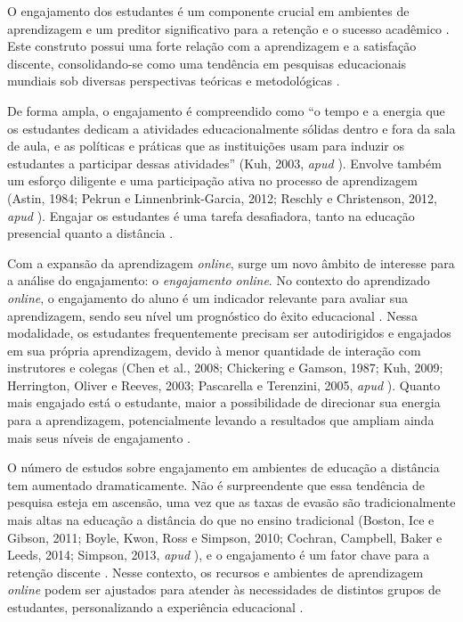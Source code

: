 O engajamento dos estudantes é um componente crucial em ambientes de aprendizagem e um preditor significativo para a retenção e o sucesso acadêmico \cite{yilmazEngagementDistanceEducation2020}. Este construto possui uma forte relação com a aprendizagem e a satisfação discente, consolidando-se como uma tendência em pesquisas educacionais mundiais sob diversas perspectivas teóricas e metodológicas \cite{ortegaMensuracaoEngajamentoOnline2022}.

De forma ampla, o engajamento é compreendido como ``o tempo e a energia que os estudantes dedicam a atividades educacionalmente sólidas dentro e fora da sala de aula, e as políticas e práticas que as instituições usam para induzir os estudantes a participar dessas atividades'' (Kuh, 2003, \textit{apud} \cite{yilmazEngagementDistanceEducation2020}). Envolve também um esforço diligente e uma participação ativa no processo de aprendizagem (Astin, 1984; Pekrun e Linnenbrink-Garcia, 2012; Reschly e Christenson, 2012, \textit{apud} \cite{henrieMeasuringStudentEngagement2015}). Engajar os estudantes é uma tarefa desafiadora, tanto na educação presencial quanto a distância \cite{yilmazEngagementDistanceEducation2020}.

Com a expansão da aprendizagem \textit{online}, surge um novo âmbito de interesse para a análise do engajamento: o \textit{engajamento online}. No contexto do aprendizado \textit{online}, o engajamento do aluno é um indicador relevante para avaliar sua aprendizagem, sendo seu nível um prognóstico do êxito educacional \cite{ortegaMensuracaoEngajamentoOnline2022}. Nessa modalidade, os estudantes frequentemente precisam ser autodirigidos e engajados em sua própria aprendizagem, devido à menor quantidade de interação com instrutores e colegas (Chen et al., 2008; Chickering e Gamson, 1987; Kuh, 2009; Herrington, Oliver e Reeves, 2003; Pascarella e Terenzini, 2005, \textit{apud} \cite{yilmazEngagementDistanceEducation2020}). Quanto mais engajado está o estudante, maior a possibilidade de direcionar sua energia para a aprendizagem, potencialmente levando a resultados que ampliam ainda mais seus níveis de engajamento \cite{ortegaMensuracaoEngajamentoOnline2022}.

O número de estudos sobre engajamento em ambientes de educação a distância tem aumentado dramaticamente. Não é surpreendente que essa tendência de pesquisa esteja em ascensão, uma vez que as taxas de evasão são tradicionalmente mais altas na educação a distância do que no ensino tradicional (Boston, Ice e Gibson, 2011; Boyle, Kwon, Ross e Simpson, 2010; Cochran, Campbell, Baker e Leeds, 2014; Simpson, 2013, \textit{apud} \cite{yilmazEngagementDistanceEducation2020}), e o engajamento é um fator chave para a retenção discente \cite{yilmazEngagementDistanceEducation2020}. Nesse contexto, os recursos e ambientes de aprendizagem \textit{online} podem ser ajustados para atender às necessidades de distintos grupos de estudantes, personalizando a experiência educacional \cite{ortegaMensuracaoEngajamentoOnline2022}.

